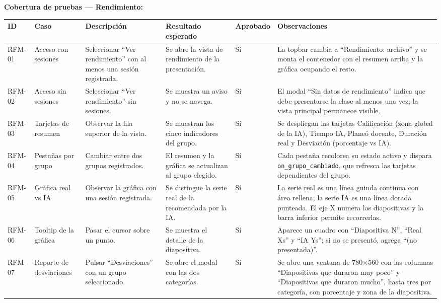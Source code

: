 \documentclass[12pt,letterpaper]{article}
\begin{document}
\textbf{Cobertura de pruebas --- Rendimiento:}

{\tiny
\renewcommand{\arraystretch}{1.15}
\begin{longtable}{|L{1.1cm}|L{2.3cm}|L{3.2cm}|L{3.6cm}|L{1.2cm}|L{3.6cm}|}
\hline
\textbf{ID} & \textbf{Caso} & \textbf{Descripción} & \textbf{Resultado esperado} & \textbf{Aprobado} & \textbf{Observaciones} \\ \hline
\endhead
RFM-01 & Acceso con sesiones & Seleccionar ``Ver rendimiento'' con al menos una sesión registrada. & Se abre la vista de rendimiento de la presentación. & Sí & La topbar cambia a ``Rendimiento: archivo'' y se monta el contenedor con el resumen arriba y la gráfica ocupando el resto. \\ \hline
RFM-02 & Acceso sin sesiones & Seleccionar ``Ver rendimiento'' sin sesiones. & Se muestra un aviso y no se navega. & Sí & El modal ``Sin datos de rendimiento'' indica que debe presentarse la clase al menos una vez; la vista principal permanece visible. \\ \hline
RFM-03 & Tarjetas de resumen & Observar la fila superior de la vista. & Se muestran los cinco indicadores del grupo. & Sí & Se despliegan las tarjetas Calificación (zona global de la IA), Tiempo IA, Planeó docente, Duración real y Desviación (porcentaje vs IA). \\ \hline
RFM-04 & Pestañas por grupo & Cambiar entre dos grupos registrados. & El resumen y la gráfica se actualizan al grupo elegido. & Sí & Cada pestaña recolorea su estado activo y dispara \texttt{on\_grupo\_cambiado}, que refresca las tarjetas dependientes del grupo. \\ \hline
RFM-05 & Gráfica real vs IA & Observar la gráfica con una sesión registrada. & Se distingue la serie real de la recomendada por la IA. & Sí & La serie real es una línea guinda continua con área rellena; la serie IA es una línea dorada punteada. El eje X numera las diapositivas y la barra inferior permite recorrerlas. \\ \hline
RFM-06 & Tooltip de la gráfica & Pasar el cursor sobre un punto. & Se muestra el detalle de la diapositiva. & Sí & Aparece un cuadro con ``Diapositiva N'', ``Real Xs'' y ``IA Ys''; si no se presentó, agrega ``(no presentada)''. \\ \hline
RFM-07 & Reporte de desviaciones & Pulsar ``Desviaciones'' con un grupo seleccionado. & Se abre el modal con las dos categorías. & Sí & Se abre una ventana de 780$\times$560 con las columnas ``Diapositivas que duraron muy poco'' y ``Diapositivas que duraron mucho'', hasta tres por categoría, con porcentaje y zona de la diapositiva. \\ \hline

\end{longtable}}
\end{document}

